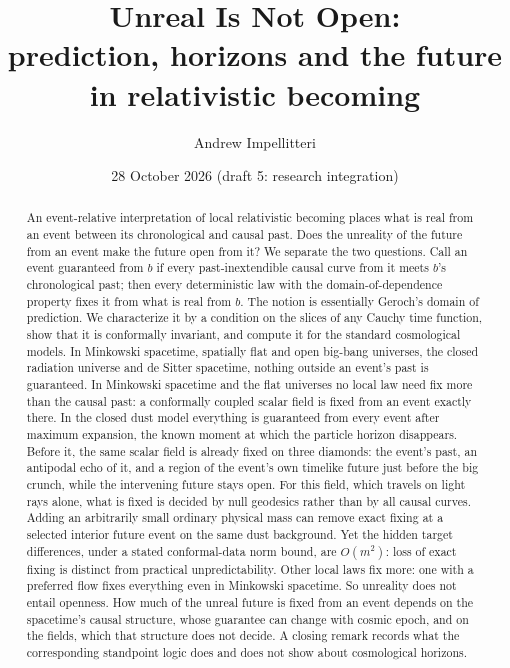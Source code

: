 \documentclass[11pt]{article}
\title{Unreal Is Not Open:\\ prediction, horizons and the future in
relativistic becoming}
\author{Andrew Impellitteri}
\date{28 October 2026 (draft 5: research integration)}
\theoremstyle{definition}
\begin{document}
\maketitle

\begin{abstract}
An event-relative interpretation of local relativistic becoming places what
is real from an event between its chronological and causal past. Does the
unreality of the future from an event make the future
open from it? We separate the two questions. Call an event guaranteed from
$b$ if every past-inextendible causal curve from it meets $b$'s chronological
past; then every deterministic law with the domain-of-dependence property
fixes it from what is real from $b$. The notion is essentially Geroch's
domain of prediction. We characterize it by a condition on the slices of any
Cauchy time function, show that it is conformally invariant, and compute it
for the standard cosmological models. In Minkowski spacetime, spatially flat
and open big-bang universes, the closed radiation universe and de Sitter
spacetime, nothing outside an event's past is guaranteed. In Minkowski
spacetime and the flat universes no local law need fix more than the causal
past: a conformally coupled scalar field is fixed from an event exactly
there. In the closed dust model everything is guaranteed from every event
after maximum expansion, the known moment at which the particle horizon
disappears. Before it, the same scalar field is already fixed on three
diamonds: the event's past, an antipodal echo of it, and a region of the
event's own timelike future just before the big crunch, while the
intervening future stays open. For this field, which travels on light rays
alone, what is fixed is decided by null geodesics rather than by all causal
curves.
Adding an arbitrarily small ordinary physical mass can remove exact fixing at
a selected interior future event on the same dust background. Yet the hidden
target differences, under a stated conformal-data norm bound, are $O(m^2)$:
loss of exact fixing is distinct from practical unpredictability.
Other local laws fix more: one with a preferred flow fixes everything even in
Minkowski spacetime. So unreality does not entail openness. How much of the
unreal future is fixed from an event depends on the spacetime's causal
structure, whose guarantee can change with cosmic epoch, and on the fields,
which that structure does not decide. A closing remark
records what the corresponding standpoint logic does and does not show about
cosmological horizons.
\end{abstract}
\end{document}
